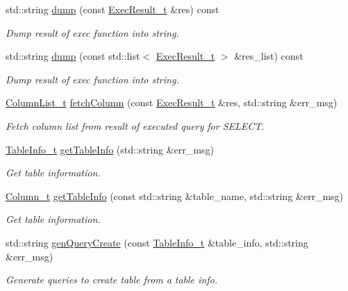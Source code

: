 \begin{DoxyCompactItemize}
std\+::string \hyperlink{classsf_1_1Fetcher_aaf6a36a51986a9abb72438d9cf747b35}{dump} (const \hyperlink{structsf_1_1ExecResult__t}{Exec\+Result\+\_\+t} \&res) const
\begin{DoxyCompactList}\small\item\em Dump result of exec function into string. \end{DoxyCompactList}\item 
std\+::string \hyperlink{classsf_1_1Fetcher_acd41bbe98c7d88a0ba8ad211828abe55}{dump} (const std\+::list$<$ \hyperlink{structsf_1_1ExecResult__t}{Exec\+Result\+\_\+t} $>$ \&res\+\_\+list) const
\begin{DoxyCompactList}\small\item\em Dump result of exec function into string. \end{DoxyCompactList}\item 
\hyperlink{namespacesf_a1307fc2d55d71a89cf1ac82655a9b1eb}{Column\+List\+\_\+t} \hyperlink{classsf_1_1Fetcher_a67777e1c33ada30349de731fab2b32c7}{fetch\+Column} (const \hyperlink{structsf_1_1ExecResult__t}{Exec\+Result\+\_\+t} \&res, std\+::string \&err\+\_\+msg)
\begin{DoxyCompactList}\small\item\em Fetch column list from result of executed query for S\+E\+L\+E\+CT. \end{DoxyCompactList}\item 
\hyperlink{namespacesf_a4427debefb8b5121ea783ab2a93a8e50}{Table\+Info\+\_\+t} \hyperlink{classsf_1_1Fetcher_a0bd974c01baa3ef6f5401ea2b75fc22d}{get\+Table\+Info} (std\+::string \&err\+\_\+msg)
\begin{DoxyCompactList}\small\item\em Get table information. \end{DoxyCompactList}\item 
\hyperlink{namespacesf_a390d6a976138adf32ace872bbd298a30}{Column\+\_\+t} \hyperlink{classsf_1_1Fetcher_a0d07d8cdd83c59e3c0dd4cc0409ecffa}{get\+Table\+Info} (const std\+::string \&table\+\_\+name, std\+::string \&err\+\_\+msg)
\begin{DoxyCompactList}\small\item\em Get table information. \end{DoxyCompactList}\item 
std\+::string \hyperlink{classsf_1_1Fetcher_aea913bb72d38e556cef1ee73a508ca1c}{gen\+Query\+Create} (const \hyperlink{namespacesf_a4427debefb8b5121ea783ab2a93a8e50}{Table\+Info\+\_\+t} \&table\+\_\+info, std\+::string \&err\+\_\+msg)
\begin{DoxyCompactList}\small\item\em Generate queries to create table from a table info. \end{DoxyCompactList}\item 

\end{DoxyCompactItemize}

